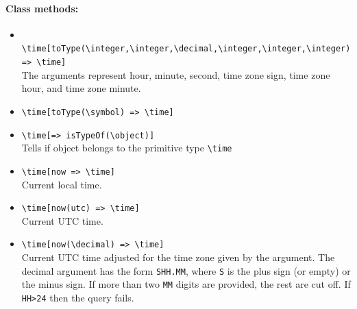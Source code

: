 \documentclass[11pt]{article}
\newcommand{\bs}{\textbackslash}
\begin{document}
\paragraph{Class methods:}
\begin{itemize}
\item {\tt
    \bs{}time[toType(\bs{}integer,\bs{}integer,\bs{}decimal,\bs{}integer,\bs{}integer,\bs{}integer)
    => \bs{}time]}
  \\
  The arguments represent hour, minute, second, time zone sign, time
  zone hour, and time zone minute.
\item {\tt \bs{}time[toType(\bs{}symbol) => \bs{}time]}
\item {\tt \bs{}time[=> isTypeOf(\bs{}object)]}
  \\
  Tells if object belongs to the primitive type {\tt \bs{}time}  
\item \texttt{\bs{}time[now => \bs{}time]} \\
  Current local time.
\item \texttt{\bs{}time[now(utc) => \bs{}time]} \\
  Current UTC time.
\item \texttt{\bs{}time[now(\bs{}decimal) => \bs{}time]} \\
  Current UTC time adjusted for the time zone given by the
  argument.
  The decimal argument has the form \texttt{SHH.MM}, where \texttt{S} is
  the plus sign (or empty) or the minus sign.
  If more than two \texttt{MM} digits are provided, the rest are cut off.
  If \texttt{HH>24} then the query fails. 
\end{itemize}
\end{document}
